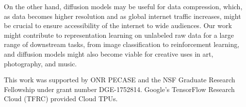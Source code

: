 On the other hand, diffusion models may be useful for data compression, which, as data becomes higher resolution and as global internet traffic increases, might be crucial to ensure accessibility of the internet to wide audiences. Our work might contribute to representation learning on unlabeled raw data for a large range of downstream tasks, from image classification to reinforcement learning, and diffusion models might also become viable for creative uses in art, photography, and music.

\begin{ack}
This work was supported by ONR PECASE and the NSF Graduate Research Fellowship under grant number DGE-1752814. Google's TensorFlow Research Cloud (TFRC) provided Cloud TPUs.
\end{ack}


